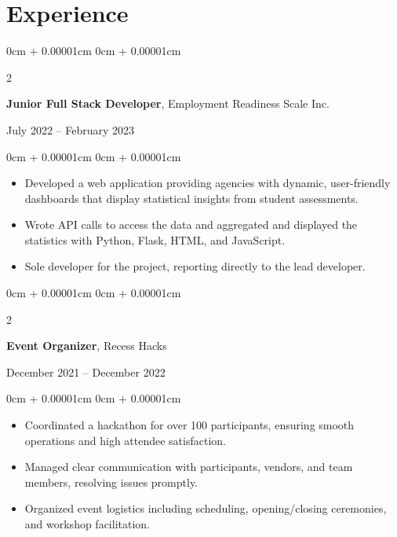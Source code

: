 \documentclass[10pt, letterpaper]{article}
\newenvironment{highlights}{
    \begin{itemize}[
        topsep=0.10cm,
        parsep=0.10cm,
        partopsep=0pt,
        itemsep=0pt,
        leftmargin=0cm + 10pt
    ]
}{
    \end{itemize}
}
\newenvironment{onecolentry}{
    \begin{adjustwidth}{
        0cm + 0.00001cm
    }{
        0cm + 0.00001cm
    }
}{
    \end{adjustwidth}
}
\newenvironment{twocolentry}[2][]{
    \onecolentry
    \def\secondColumn{#2}
    \setcolumnwidth{\fill, 5.5 cm} %
    \begin{paracol}{2}
}{
    \switchcolumn \raggedleft \secondColumn
    \end{paracol}
    \endonecolentry
}
\begin{document}
    \section{Experience}
    \begin{twocolentry}{July 2022 – February 2023}
        \textbf{Junior Full Stack Developer}, Employment Readiness Scale Inc.
    \end{twocolentry}
    \vspace{0.10cm}
    \begin{onecolentry}
        \begin{highlights}
            \item Developed a web application providing agencies with dynamic, user-friendly dashboards that display statistical insights from student assessments.
            \item Wrote API calls to access the data and aggregated and displayed the statistics with Python, Flask, HTML, and JavaScript. 
            \item Sole developer for the project, reporting directly to the lead developer.
        \end{highlights}
    \end{onecolentry}

    \vspace{0.2cm}

    \begin{twocolentry}{December 2021 – December 2022}
        \textbf{Event Organizer}, Recess Hacks
    \end{twocolentry}
    \begin{onecolentry}
        \begin{highlights}
            \item Coordinated a hackathon for over 100 participants, ensuring smooth operations and high attendee satisfaction.
            \item Managed clear communication with participants, vendors, and team members, resolving issues promptly.
            \item Organized event logistics including scheduling, opening/closing ceremonies, and workshop facilitation.
        \end{highlights}
    \end{onecolentry}
\end{document}
